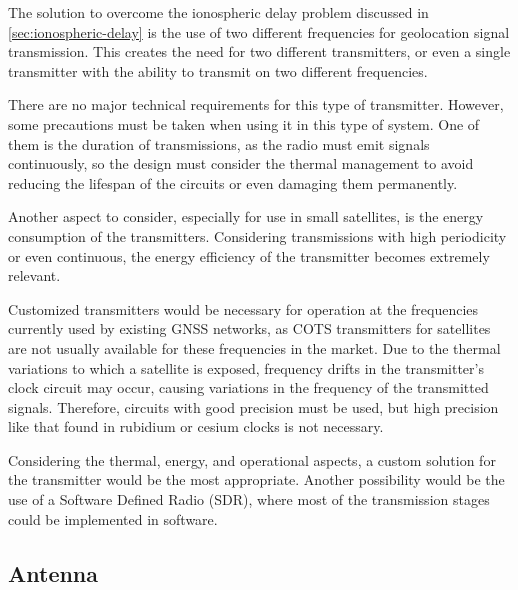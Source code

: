 
The solution to overcome the ionospheric delay problem discussed in \autoref{sec:ionospheric-delay} is the use of two different frequencies for geolocation signal transmission. This creates the need for two different transmitters, or even a single transmitter with the ability to transmit on two different frequencies.

There are no major technical requirements for this type of transmitter. However, some precautions must be taken when using it in this type of system. One of them is the duration of transmissions, as the radio must emit signals continuously, so the design must consider the thermal management to avoid reducing the lifespan of the circuits or even damaging them permanently.

Another aspect to consider, especially for use in small satellites, is the energy consumption of the transmitters. Considering transmissions with high periodicity or even continuous, the energy efficiency of the transmitter becomes extremely relevant.

Customized transmitters would be necessary for operation at the frequencies currently used by existing GNSS networks, as COTS transmitters for satellites are not usually available for these frequencies in the market. Due to the thermal variations to which a satellite is exposed, frequency drifts in the transmitter's clock circuit may occur, causing variations in the frequency of the transmitted signals. Therefore, circuits with good precision must be used, but high precision like that found in rubidium or cesium clocks is not necessary.

Considering the thermal, energy, and operational aspects, a custom solution for the transmitter would be the most appropriate. Another possibility would be the use of a Software Defined Radio (SDR), where most of the transmission stages could be implemented in software.

\subsection{Antenna}


